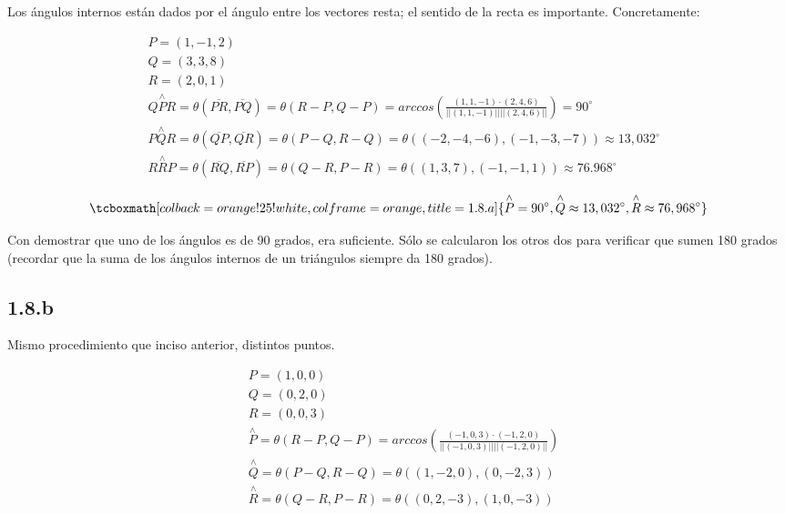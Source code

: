 \documentclass{article}
\begin{document}
Los ángulos internos están dados por el ángulo entre los vectores resta; el sentido de la recta es importante. Concretamente:

\begin{subequations}
\begin{align}
& P = (1, -1, 2) \\
& Q = (3, 3, 8) \\
& R = (2, 0, 1) \\
& Q\overset{\wedge}{P}R = \theta(\overline{PR}, \overline{PQ}) = \theta(R-P, Q-P) = arccos \left(\frac{(1,1,-1) \cdot (2, 4, 6)}{||(1, 1, -1)|| ||(2,4,6)||} \right) = 90^{\circ} \\
& P\overset{\wedge}{Q}R = \theta(\overline{QP}, \overline{QR}) = \theta(P-Q, R-Q) = \theta((-2,-4,-6),(-1, -3, -7)) \approx 13,032^{\circ} \\
& R\overset{\wedge}{R}P = \theta(\overline{RQ}, \overline{RP}) = \theta(Q-R, P-R) = \theta((1,3,7),(-1, -1, 1)) \approx 76.968^{\circ}
\end{align}
\end{subequations}

\begin{equation}
\tcboxmath[colback=orange!25!white,colframe=orange, title=1.8.a]
{ \overset{\wedge}{P} = 90^{\circ}, \overset{\wedge}{Q} \approx 13,032^{\circ}, \overset{\wedge}{R} \approx 76,968^{\circ} }
\end{equation}

Con demostrar que uno de los ángulos es de 90 grados, era suficiente. Sólo se calcularon los otros dos para verificar que sumen 180 grados (recordar que la suma de los ángulos internos de un triángulos siempre da 180 grados).

\subsection*{1.8.b}
\label{subsec:1.8.b}

Mismo procedimiento que inciso anterior, distintos puntos.

\begin{subequations}
\begin{align}
& P = (1, 0, 0) \\
& Q = (0, 2, 0) \\
& R = (0, 0, 3) \\
& \overset{\wedge}{P} = \theta(R-P, Q-P) = arccos \left(\frac{(-1,0,3) \cdot (-1, 2, 0)}{||(-1, 0, 3)|| ||(-1,2,0)||} \right) \\
& \overset{\wedge}{Q} = \theta(P-Q, R-Q) = \theta((1,-2,0),(0, -2, 3)) \\
& \overset{\wedge}{R} = \theta(Q-R, P-R) = \theta((0,2,-3),(1, 0, -3))
\end{align}
\end{subequations}
\end{document}
